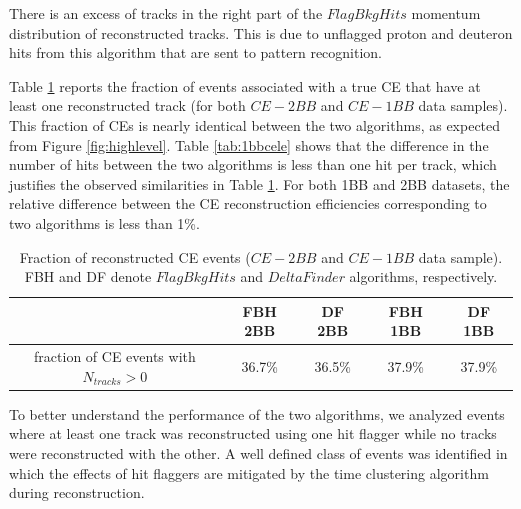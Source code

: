 There is an excess of tracks in the right part of the 
$FlagBkgHits$ momentum distribution of reconstructed tracks. 
This is due to unflagged proton and deuteron hits from this 
algorithm that are sent to pattern recognition.

Table \ref{tab:recoeffcele} reports 
the fraction of events associated 
with a true CE that have at least one 
reconstructed track (for both 
$CE-2BB$ and $CE-1BB$ data samples). 
This fraction of CEs is nearly identical 
between the two algorithms, 
as expected from Figure \ref{fig:highlevel}.
Table \ref{tab:1bbcele} shows 
that the difference in the number of 
hits between the two algorithms 
is less than one hit per track, which 
justifies the observed similarities in 
Table \ref{tab:recoeffcele}.
For both 1BB and 2BB datasets, the relative difference between the 
CE reconstruction efficiencies corresponding to two algorithms is less than 1\%.



\begin{center}
    \begin{table}[h!]
    \centering
    \renewcommand{\arraystretch}{1.}
    \begin{tabular}{| c | c | c | c | c |} 
    \hline
    & FBH 2BB & DF 2BB & FBH 1BB & DF 1BB  \\
    \hline
    fraction of CE events with $N_{tracks}>0$ & 36.7\% & 36.5\% & 37.9\% & 37.9\%\\
    \hline
    \end{tabular}
    \caption{Fraction of reconstructed CE events ($CE-2BB$ and $CE-1BB$ data sample). FBH and DF denote  
    $FlagBkgHits$ and $DeltaFinder$ algorithms, respectively.}
    \label{tab:recoeffcele}
\end{table}
\end{center}

To better understand the performance of the 
two algorithms, 
we analyzed events where at least one 
track was reconstructed 
using one hit flagger while no tracks 
were reconstructed 
with the other. A well defined class 
of events was identified in 
which the effects of hit flaggers are 
mitigated by the time 
clustering algorithm during reconstruction.

